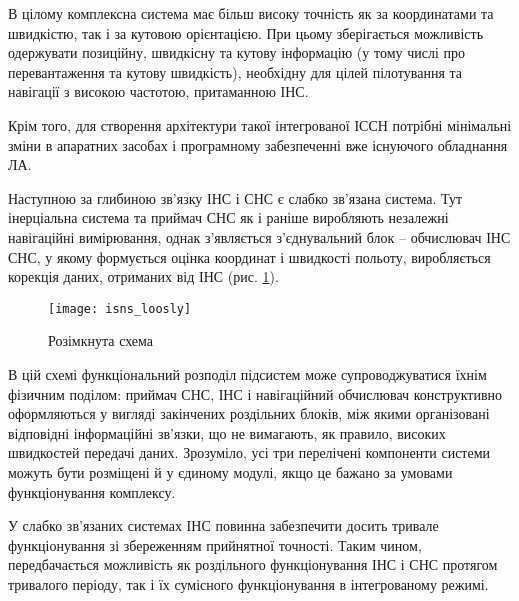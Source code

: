 В цілому комплексна система має більш високу точність як за координатами та швидкістю, 
так і за кутовою орієнтацією. При цьому зберігається можливість одержувати позиційну, 
швидкісну та кутову інформацію (у тому числі про перевантаження та кутову швидкість), 
необхідну для цілей пілотування та навігації з високою частотою, притаманною ІНС.

Крім того, для створення  архітектури такої інтегрованої ІССН потрібні мінімальні зміни 
в апаратних засобах і програмному забезпеченні вже існуючого обладнання ЛА.

Наступною за глибиною зв'язку ІНС і СНС є слабко зв'язана система. Тут інерціальна 
система та приймач СНС як і раніше виробляють незалежні навігаційні вимірювання, 
однак з'являється з'єднувальний блок -- обчислювач ІНС СНС, у якому формується оцінка 
координат і швидкості польоту, виробляється корекція даних, отриманих від ІНС (рис. 
\ref{fig:isns_loosly}).

\begin{figure}[here]
\centering
\texttt{[image: isns\_loosly]}
\caption{Розімкнута схема}
\label{fig:isns_loosly}
\end{figure}

В цій схемі функціональний розподіл підсистем може супроводжуватися їхнім фізичним 
поділом: приймач СНС, ІНС і навігаційний обчислювач конструктивно оформляються у 
вигляді закінчених роздільних блоків, між якими організовані відповідні інформаційні 
зв'язки, що не вимагають, як правило, високих швидкостей передачі даних. Зрозуміло, 
усі три перелічені компоненти системи можуть бути розміщені й у єдиному модулі, якщо 
це бажано за умовами функціонування комплексу.

У слабко зв'язаних системах ІНС повинна забезпечити досить тривале функціонування 
зі  збереженням прийнятної точності.  Таким  чином, передбачається можливість як 
роздільного функціонування ІНС і СНС протягом тривалого періоду, так і їх сумісного 
функціонування в інтегрованому режимі. 

